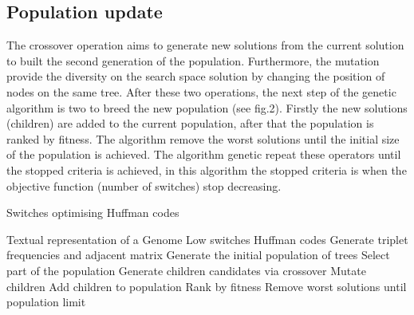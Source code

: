 \documentclass[preprint,12pt]{elsarticle}
\begin{document}
\subsection{Population update}
The crossover operation aims to generate new solutions from the current solution to built the second generation of the population. Furthermore, the mutation provide the diversity on the search space solution by changing the position of  nodes on the same tree. After these two operations, the next step of the genetic algorithm is two to breed the new population (see fig.2). Firstly the new solutions (children) are added to the current population, after that the population is ranked by fitness. The algorithm remove the worst solutions until the initial size of the population is achieved. The algorithm genetic repeat these operators until the stopped criteria is achieved, in this algorithm the stopped criteria is when the objective function (number of switches) stop decreasing.
\begin{algorithm}[!btph]
\caption{Switches optimising Huffman codes}
\label{alg1}
\begin{algorithmic}[1]
\REQUIRE Textual representation of a Genome
\ENSURE Low switches Huffman codes
\STATE Generate triplet frequencies and adjacent matrix 
\STATE Generate the initial  population of trees
\REPEAT 
\STATE Select part of the population
\STATE Generate children candidates via crossover
\STATE Mutate children
\STATE Add children to population
\STATE Rank by fitness
\STATE Remove worst solutions until population limit
\end{algorithmic}
\end{algorithm}
\end{document}
